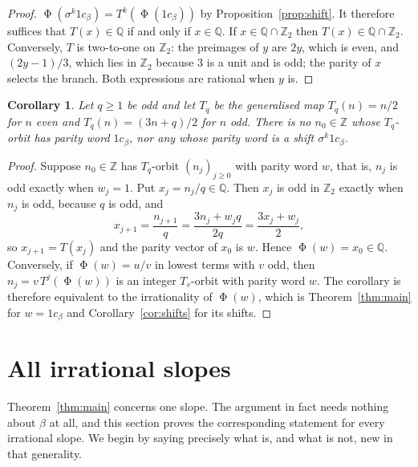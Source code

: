 \documentclass[11pt,reqno]{amsart}
\theoremstyle{plain}
\newtheorem{corollary}[theorem]{Corollary}
\theoremstyle{definition}
\newcommand{\Zt}{\mathbb{Z}_2}
\newcommand{\Z}{\mathbb{Z}}
\newcommand{\Q}{\mathbb{Q}}
\DeclareMathOperator{\Ph}{\Phi}
\begin{document}
\begin{proof}
$\Ph(\sigma^{k}1c_\beta)=T^{k}(\Ph(1c_\beta))$ by Proposition~\ref{prop:shift}. It
therefore suffices that $T(x)\in\Q$ if and only if $x\in\Q$. If $x\in\Q\cap\Zt$
then $T(x)\in\Q\cap\Zt$. Conversely, $T$ is two-to-one on $\Zt$: the preimages of
$y$ are $2y$, which is even, and $(2y-1)/3$, which lies in $\Zt$ because $3$ is a
unit and is odd; the parity of $x$ selects the branch. Both expressions are
rational when $y$ is.
\end{proof}

\begin{corollary}\label{cor:3xq}
Let $q\ge1$ be odd and let $T_q$ be the generalised map $T_q(n)=n/2$ for $n$ even
and $T_q(n)=(3n+q)/2$ for $n$ odd. There is no $n_0\in\Z$ whose $T_q$-orbit has
parity word $1c_\beta$, nor any whose parity word is a shift $\sigma^{k}1c_\beta$.
\end{corollary}

\begin{proof}
Suppose $n_0\in\Z$ has $T_q$-orbit $(n_j)_{j\ge0}$ with parity word $w$, that is,
$n_j$ is odd exactly when $w_j=1$. Put $x_j=n_j/q\in\Q$. Then $x_j$ is odd in
$\Zt$ exactly when $n_j$ is odd, because $q$ is odd, and
\[
x_{j+1}=\frac{n_{j+1}}{q}=\frac{3n_j+w_jq}{2q}=\frac{3x_j+w_j}{2},
\]
so $x_{j+1}=T(x_j)$ and the parity vector of $x_0$ is $w$. Hence
$\Ph(w)=x_0\in\Q$. Conversely, if $\Ph(w)=u/v$ in lowest terms with $v$ odd, then
$n_j=v\,T^{j}(\Ph(w))$ is an integer $T_v$-orbit with parity word $w$. The
corollary is therefore equivalent to the irrationality of $\Ph(w)$, which is
Theorem~\ref{thm:main} for $w=1c_\beta$ and Corollary~\ref{cor:shifts} for its
shifts.
\end{proof}

\section{All irrational slopes}\label{sec:allslopes}

Theorem~\ref{thm:main} concerns one slope. The argument in fact needs nothing
about $\beta$ at all, and this section proves the corresponding statement for
every irrational slope. We begin by saying precisely what is, and what is not,
new in that generality.
\end{document}
